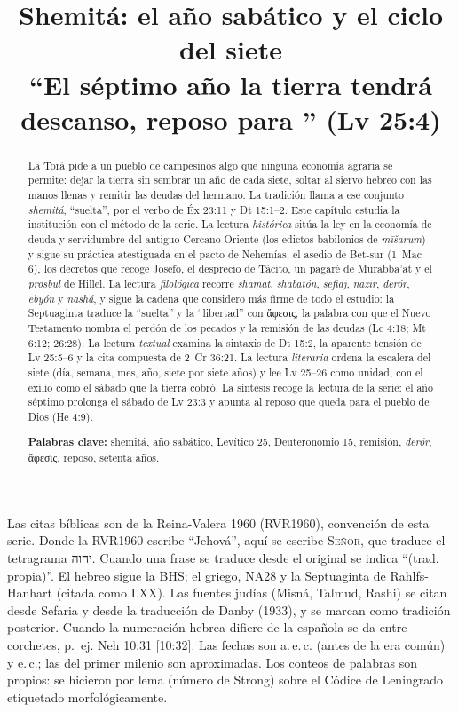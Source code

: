 \documentclass[11pt,letterpaper]{article}
\title{\color{tierraroja}\bfseries Shemitá: el año sabático y el ciclo del siete\\[4pt]\large\color{sepia}\mdseries ``El séptimo año la tierra tendrá descanso, reposo para \SENOR'' (Lv 25:4)}
\author{}\date{}
\newcommand{\heb}[1]{\mbox{\foreignlanguage{hebrew}{#1}}}
\newcommand{\grc}[1]{\foreignlanguage{ancientgreek}{#1}}
\newcommand{\SENOR}{\textsc{Señor}}
\begin{document}
\maketitle\thispagestyle{empty}

\begin{abstract}\noindent
La Torá pide a un pueblo de campesinos algo que ninguna economía agraria se permite: dejar la tierra sin sembrar un año de cada siete, soltar al siervo hebreo con las manos llenas y remitir las deudas del hermano. La tradición llama a ese conjunto \emph{shemitá}, ``suelta'', por el verbo de Éx 23:11 y Dt 15:1--2. Este capítulo estudia la institución con el método de la serie. La lectura \emph{histórica} sitúa la ley en la economía de deuda y servidumbre del antiguo Cercano Oriente (los edictos babilonios de \emph{mīšarum}) y sigue su práctica atestiguada en el pacto de Nehemías, el asedio de Bet-sur (1~Mac 6), los decretos que recoge Josefo, el desprecio de Tácito, un pagaré de Murabba'at y el \emph{prosbul} de Hillel. La lectura \emph{filológica} recorre \emph{shamat}, \emph{shabatón}, \emph{sefiaj}, \emph{nazir}, \emph{derór}, \emph{ebyón} y \emph{nashá}, y sigue la cadena que considero más firme de todo el estudio: la Septuaginta traduce la ``suelta'' y la ``libertad'' con \grc{ἄφεσις}, la palabra con que el Nuevo Testamento nombra el perdón de los pecados y la remisión de las deudas (Lc 4:18; Mt 6:12; 26:28). La lectura \emph{textual} examina la sintaxis de Dt 15:2, la aparente tensión de Lv 25:5--6 y la cita compuesta de 2~Cr 36:21. La lectura \emph{literaria} ordena la escalera del siete (día, semana, mes, año, siete por siete años) y lee Lv 25--26 como unidad, con el exilio como el sábado que la tierra cobró. La síntesis recoge la lectura de la serie: el año séptimo prolonga el sábado de Lv 23:3 y apunta al reposo que queda para el pueblo de Dios (He 4:9).
\par\smallskip\noindent\textbf{Palabras clave:} shemitá, año sabático, Levítico 25, Deuteronomio 15, remisión, \emph{derór}, \grc{ἄφεσις}, reposo, setenta años.\end{abstract}

\begin{nota}
Las citas bíblicas son de la Reina-Valera 1960 (RVR1960), convención de esta serie. Donde la RVR1960 escribe ``Jehová'', aquí se escribe \SENOR, que traduce el tetragrama \heb{יהוה}. Cuando una frase se traduce desde el original se indica ``(trad. propia)''. El hebreo sigue la BHS; el griego, NA28 y la Septuaginta de Rahlfs-Hanhart (citada como LXX). Las fuentes judías (Misná, Talmud, Rashi) se citan desde Sefaria y desde la traducción de Danby (1933), y se marcan como tradición posterior. Cuando la numeración hebrea difiere de la española se da entre corchetes, p.~ej. Neh 10:31 [10:32]. Las fechas son a.\,e.\,c. (antes de la era común) y e.\,c.; las del primer milenio son aproximadas. Los conteos de palabras son propios: se hicieron por lema (número de Strong) sobre el Códice de Leningrado etiquetado morfológicamente.
\end{nota}
\end{document}
